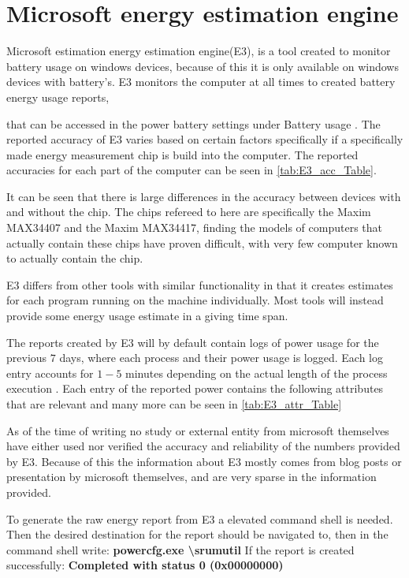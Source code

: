 \section{Microsoft energy estimation engine}
Microsoft estimation energy estimation engine(E3), is a tool created to monitor battery usage on windows devices, because of this it is only available on windows devices with battery's. E3 monitors the computer at all times to created battery energy usage reports, 

that can be accessed in the power battery settings under Battery usage \cite[p.43]{E3WinHec}. The reported accuracy of E3 varies based on certain factors specifically if a specifically made energy measurement chip is build into the computer. The reported accuracies for each part of the computer can be seen in \cref{tab:E3_acc_Table}. 


It can be seen that there is large differences in the accuracy between devices with and without the chip. The chips refereed to here are specifically the Maxim MAX34407 and the Maxim MAX34417, finding the models of computers that actually contain these chips have proven difficult, with very few computer known to actually contain the chip. 

E3 differs from other tools with similar functionality in that it creates estimates for each program running on the machine individually. Most tools will instead provide some energy usage estimate in a giving time span. 

The reports created by E3 will by default contain logs of power usage for the previous $7$ days, where each process and their power usage is logged. Each log entry accounts for $1-5$ minutes depending on the actual length of the process execution \cite[]{E3Video}. Each entry of the reported power contains the following attributes that are relevant and many more can be seen in \cref{tab:E3_attr_Table}

As of the time of writing no study or external entity from microsoft themselves have either used nor verified the accuracy and reliability of the numbers provided by E3. Because of this the information about E3 mostly comes from blog posts or presentation by microsoft themselves, and are very sparse in the information provided.

To generate the raw energy report from E3 a elevated command shell is needed. Then the desired destination for the report should be navigated to, then in the command shell write:
\newline
\textbf{powercfg.exe \textbackslash srumutil}
\newline
If the report is created successfully:
\newline
\textbf{Completed with status 0 (0x00000000)} 

